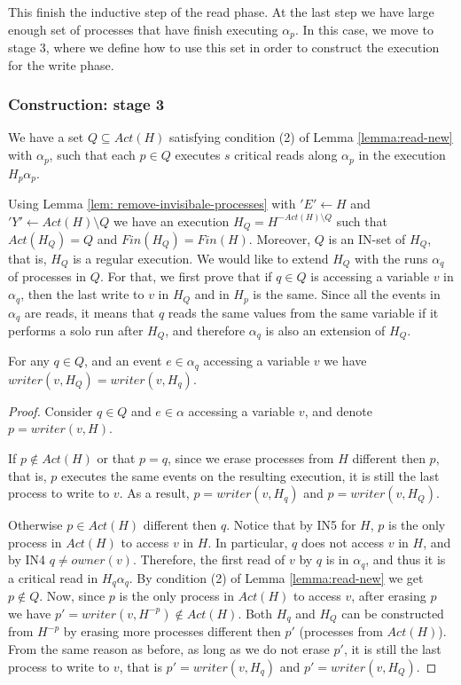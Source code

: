 This finish the inductive step of the read phase. At the last step we have large enough set of processes that have finish executing $\alpha_p$. In this case, we move to stage 3, where we define how to use this set in order to construct the execution for the write phase.



\subsubsection{Construction: stage 3}

We have a set $Q \subseteq Act(H)$ satisfying condition (2) of Lemma \ref{lemma:read-new} with $\alpha_p$, such that each $p \in Q$ executes $s$ critical reads along $\alpha_p$ in the execution $H_p \alpha_p$.

Using Lemma \ref{lem: remove-invisibale-processes} with $'E' \leftarrow H$ and $'Y' \leftarrow Act(H) \setminus Q$ we have an execution $H_Q = H^{-Act(H) \setminus Q}$ such that $Act(H_Q) = Q$ and $Fin(H_Q) = Fin(H)$. Moreover, $Q$ is an IN-set of $H_Q$, that is, $H_Q$ is a regular execution.
We would like to extend $H_Q$ with the runs $\alpha_q$ of processes in $Q$. For that, we first prove that if $q \in Q$ is accessing a variable $v$ in $\alpha_q$, then the last write to $v$ in $H_Q$ and in $H_p$ is the same. Since all the events in $\alpha_q$ are reads, it means that $q$ reads the same values from the same variable if it performs a solo run after $H_Q$, and therefore $\alpha_q$ is also an extension of $H_Q$.

\begin{claim-subsection}
	For any $q \in Q$, and an event $e \in \alpha_q$ accessing a variable $v$ we have $writer(v,H_Q) = writer(v,H_q)$.
\end{claim-subsection}

\begin{proof}
	Consider $q \in Q$ and $e \in \alpha$ accessing a variable $v$, and denote $p = writer(v,H)$.
	
	If $p \notin Act(H)$ or that $p = q$, since we erase processes from $H$ different then $p$, that is, $p$ executes the same events on the resulting execution, it is still the last process to write to $v$. As a result, $p = writer(v,H_q)$ and $p = writer(v,H_Q)$.
	
	Otherwise $p \in Act(H)$ different then $q$. Notice that by IN5 for $H$, $p$ is the only process in $Act(H)$ to access $v$ in $H$. In particular, $q$ does not access $v$ in $H$, and by IN4 $q \neq owner(v)$. Therefore, the first read of $v$ by $q$ is in $\alpha_q$, and thus it is a critical read in $H_q \alpha_q$. By condition (2) of Lemma \ref{lemma:read-new} we get $p \notin Q$. Now, since $p$ is the only process in $Act(H)$ to access $v$, after erasing $p$ we have $p' = writer(v,H^{-p}) \notin Act(H)$. Both $H_q$ and $H_Q$ can be constructed from $H^{-p}$ by erasing more processes different then $p'$ (processes from $Act(H)$). From the same reason as before, as long as we do not erase $p'$, it is still the last process to write to $v$, that is $p' = writer(v,H_q)$ and $p' = writer(v,H_Q)$.
\end{proof}

